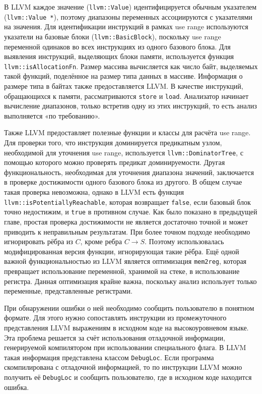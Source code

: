 В LLVM каждое значение (\texttt{llvm::Value}) идентифицируется обычным
указателем (\texttt{llvm::Value *}), поэтому диапазоны переменных
ассоциируются с указателями на значения. Для идентификации инструкций
в рамках use range используются указатели на базовые блоки
(\texttt{llvm::BasicBlock}), поскольку use range переменной одинаков
во всех инструкциях из одного базового блока. Для выявления
инструкций, выделяющих блоки памяти, используется функция
\texttt{llvm::isAllocationFn}. Размер массива вычисляется как число
байт, выделяемых такой функций, поделённое на размер типа данных в
массиве. Информация о размере типа в байтах также предоставляется
LLVM. В качестве инструкций, обращающихся к памяти, рассматриваются
\texttt{store} и \texttt{load}. Анализатор начинает вычисление
диапазонов, только встретив одну из этих инструкций, то есть анализ
выполняется «по требованию».

Также LLVM предоставляет полезные функции и классы для расчёта use
range. Для проверки того, что инструкция доминируется предикатным
узлом, необходимой для уточнения use range, используется
\texttt{llvm::DominatorTree}, с помощью которого можно проверять
предикат доминируемости. Другая функциональность, необходимая для
уточнения диапазона значений, заключается в проверке достижимости
одного базового блока из другого. В общем случае такая проверка
невозможна, однако в LLVM есть функция
\texttt{llvm::isPotentiallyReachable}, которая возвращает
\texttt{false}, если базовый блок точно недостижим, и \texttt{true} в
противном случае. Как было показано в предыдущей главе, простая
проверка достижимости не является достаточно точной и может приводить
к неправильным результатам. При более точном подходе необходимо
игнорировать рёбра из $C$, кроме ребра $C \rightarrow S$. Поэтому
использовалась модифицированная версия функции, игнорирующая такие
рёбра. Ещё одной важной функциональностью из LLVM является оптимизация
\texttt{mem2reg}, которая превращает использование переменной,
хранимой на стеке, в использование регистра. Данная оптимизация крайне
важна, поскольку анализ использует только переменные, представленные
регистрами.

При обнаружении ошибки о ней необходимо сообщить пользователю в
понятном формате. Для этого нужно сопоставлять инструкции из
промежуточного представления LLVM выражениям в исходном коде на
высокоуровневом языке. Эта проблема решается за счёт использования
отладочной информации, генерируемой компилятором при использовании
специального флага. В LLVM такая информация представлена классом
\texttt{DebugLoc}. Если программа скомпилирована с отладочной информацией, то
по инструкции LLVM можно получить её \texttt{DebugLoc} и сообщить
пользователю, где в исходном коде находится ошибка.

